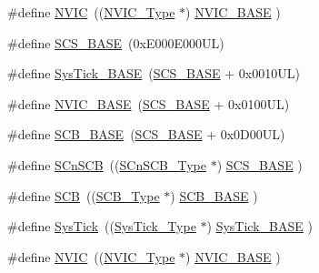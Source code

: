 \begin{DoxyCompactItemize}
\item 
\#define \mbox{\hyperlink{group___c_m_s_i_s__core__base_gac8e97e8ce56ae9f57da1363a937f8a17}{N\+V\+IC}}~((\mbox{\hyperlink{struct_n_v_i_c___type}{N\+V\+I\+C\+\_\+\+Type}}      $\ast$)     \mbox{\hyperlink{group___c_m_s_i_s__core__base_gaa0288691785a5f868238e0468b39523d}{N\+V\+I\+C\+\_\+\+B\+A\+SE}}     )
\item 
\#define \mbox{\hyperlink{group___c_m_s_i_s__core__base_ga3c14ed93192c8d9143322bbf77ebf770}{S\+C\+S\+\_\+\+B\+A\+SE}}~(0x\+E000\+E000\+U\+L)
\item 
\#define \mbox{\hyperlink{group___c_m_s_i_s__core__base_ga58effaac0b93006b756d33209e814646}{Sys\+Tick\+\_\+\+B\+A\+SE}}~(\mbox{\hyperlink{group___c_m_s_i_s__core__base_ga3c14ed93192c8d9143322bbf77ebf770}{S\+C\+S\+\_\+\+B\+A\+SE}} +  0x0010\+U\+L)
\item 
\#define \mbox{\hyperlink{group___c_m_s_i_s__core__base_gaa0288691785a5f868238e0468b39523d}{N\+V\+I\+C\+\_\+\+B\+A\+SE}}~(\mbox{\hyperlink{group___c_m_s_i_s__core__base_ga3c14ed93192c8d9143322bbf77ebf770}{S\+C\+S\+\_\+\+B\+A\+SE}} +  0x0100\+U\+L)
\item 
\#define \mbox{\hyperlink{group___c_m_s_i_s__core__base_gad55a7ddb8d4b2398b0c1cfec76c0d9fd}{S\+C\+B\+\_\+\+B\+A\+SE}}~(\mbox{\hyperlink{group___c_m_s_i_s__core__base_ga3c14ed93192c8d9143322bbf77ebf770}{S\+C\+S\+\_\+\+B\+A\+SE}} +  0x0\+D00\+U\+L)
\item 
\#define \mbox{\hyperlink{group___c_m_s_i_s__core__base_ga9fe0cd2eef83a8adad94490d9ecca63f}{S\+Cn\+S\+CB}}~((\mbox{\hyperlink{struct_s_cn_s_c_b___type}{S\+Cn\+S\+C\+B\+\_\+\+Type}}    $\ast$)     \mbox{\hyperlink{group___c_m_s_i_s__core__base_ga3c14ed93192c8d9143322bbf77ebf770}{S\+C\+S\+\_\+\+B\+A\+SE}}      )
\item 
\#define \mbox{\hyperlink{group___c_m_s_i_s__core__base_gaaaf6477c2bde2f00f99e3c2fd1060b01}{S\+CB}}~((\mbox{\hyperlink{struct_s_c_b___type}{S\+C\+B\+\_\+\+Type}}       $\ast$)     \mbox{\hyperlink{group___c_m_s_i_s__core__base_gad55a7ddb8d4b2398b0c1cfec76c0d9fd}{S\+C\+B\+\_\+\+B\+A\+SE}}      )
\item 
\#define \mbox{\hyperlink{group___c_m_s_i_s__core__base_gacd96c53beeaff8f603fcda425eb295de}{Sys\+Tick}}~((\mbox{\hyperlink{struct_sys_tick___type}{Sys\+Tick\+\_\+\+Type}}   $\ast$)     \mbox{\hyperlink{group___c_m_s_i_s__core__base_ga58effaac0b93006b756d33209e814646}{Sys\+Tick\+\_\+\+B\+A\+SE}}  )
\item 
\#define \mbox{\hyperlink{group___c_m_s_i_s__core__base_gac8e97e8ce56ae9f57da1363a937f8a17}{N\+V\+IC}}~((\mbox{\hyperlink{struct_n_v_i_c___type}{N\+V\+I\+C\+\_\+\+Type}}      $\ast$)     \mbox{\hyperlink{group___c_m_s_i_s__core__base_gaa0288691785a5f868238e0468b39523d}{N\+V\+I\+C\+\_\+\+B\+A\+SE}}     )

\end{DoxyCompactItemize}
